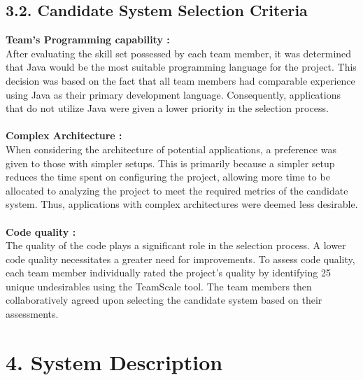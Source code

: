 \documentclass[letterpaper, 11pt]{report}
\begin{document}
\subsection*{3.2. Candidate System Selection Criteria}
\normalsize{\textbf{Team’s Programming capability :}\\
After evaluating the skill set possessed by each team member, it was determined that Java would be the most suitable programming language for the project. This decision was based on the fact that all team members had comparable experience using Java as their primary development language. Consequently, applications that do not utilize Java were given a lower priority in the selection process.}\\
\\
\normalsize{\textbf{Complex Architecture :}\\
When considering the architecture of potential applications, a preference was given to those with simpler setups. This is primarily because a simpler setup reduces the time spent on configuring the project, allowing more time to be allocated to analyzing the project to meet the required metrics of the candidate system. Thus, applications with complex architectures were deemed less desirable.}\\
\\
\normalsize{\textbf{Code quality :}\\
The quality of the code plays a significant role in the selection process. A lower code quality necessitates a greater need for improvements. To assess code quality, each team member individually rated the project's quality by identifying 25 unique undesirables using the TeamScale tool. The team members then collaboratively agreed upon selecting the candidate system based on their assessments.}\\
\pagebreak
{}
\section*{4. System Description}
\end{document}
